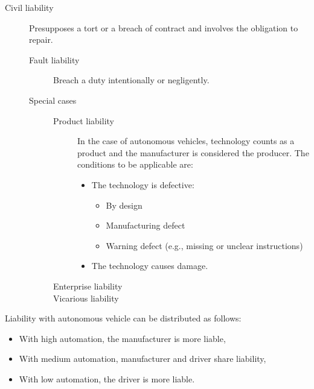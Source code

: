 \begin{description}
    \item[Civil liability] 
        Presupposes a tort or a breach of contract and involves the obligation to repair.

        \begin{description}
            \item[Fault liability] Breach a duty intentionally or negligently. 
            \item[Special cases] \phantom{}
                \begin{description}
                    \item[Product liability] In the case of autonomous vehicles, technology counts as a product and the manufacturer is considered the producer. The conditions to be applicable are:
                    \begin{itemize}
                        \item The technology is defective:
                        \begin{itemize}
                            \item By design
                            \item Manufacturing defect
                            \item Warning defect (e.g., missing or unclear instructions)
                        \end{itemize}
                        \item The technology causes damage.
                    \end{itemize}
                    \item[Enterprise liability] 
                    \item[Vicarious liability] 
                \end{description}
        \end{description}
\end{description}

\begin{remark}
    Liability with autonomous vehicle can be distributed as follows:
    \begin{itemize}
        \item With high automation, the manufacturer is more liable,
        \item With medium automation, manufacturer and driver share liability,
        \item With low automation, the driver is more liable.
    \end{itemize}
\end{remark}


